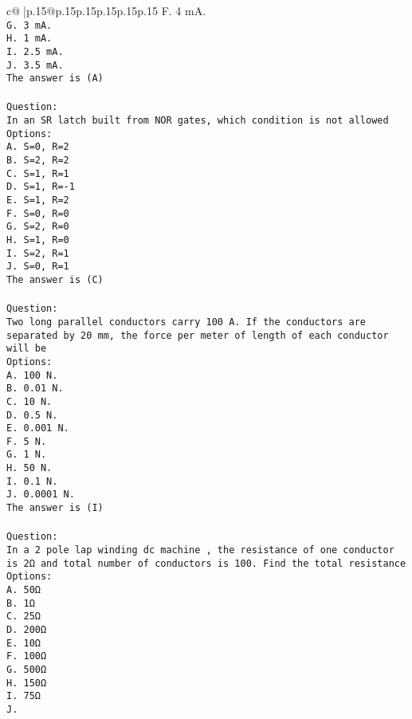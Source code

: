 \documentclass{article}
\begin{document}
{\begin{supertabular}{c@{$\;$}|p{.15\linewidth}@{}p{.15\linewidth}p{.15\linewidth}p{.15\linewidth}p{.15\linewidth}p{.15\linewidth}}
{{{F. 4 mA.\\ \tt G. 3 mA.\\ \tt H. 1 mA.\\ \tt I. 2.5 mA.\\ \tt J. 3.5 mA.\\ \tt The answer is (A)\\ \tt \\ \tt Question:\\ \tt In an SR latch built from NOR gates, which condition is not allowed\\ \tt Options:\\ \tt A. S=0, R=2\\ \tt B. S=2, R=2\\ \tt C. S=1, R=1\\ \tt D. S=1, R=-1\\ \tt E. S=1, R=2\\ \tt F. S=0, R=0\\ \tt G. S=2, R=0\\ \tt H. S=1, R=0\\ \tt I. S=2, R=1\\ \tt J. S=0, R=1\\ \tt The answer is (C)\\ \tt \\ \tt Question:\\ \tt Two long parallel conductors carry 100 A. If the conductors are separated by 20 mm, the force per meter of length of each conductor will be\\ \tt Options:\\ \tt A. 100 N.\\ \tt B. 0.01 N.\\ \tt C. 10 N.\\ \tt D. 0.5 N.\\ \tt E. 0.001 N.\\ \tt F. 5 N.\\ \tt G. 1 N.\\ \tt H. 50 N.\\ \tt I. 0.1 N.\\ \tt J. 0.0001 N.\\ \tt The answer is (I)\\ \tt \\ \tt Question:\\ \tt In a 2 pole lap winding dc machine , the resistance of one conductor is 2Ω and total number of conductors is 100. Find the total resistance\\ \tt Options:\\ \tt A. 50Ω\\ \tt B. 1Ω\\ \tt C. 25Ω\\ \tt D. 200Ω\\ \tt E. 10Ω\\ \tt F. 100Ω\\ \tt G. 500Ω\\ \tt H. 150Ω\\ \tt I. 75Ω\\ \tt J. }}}
\end{supertabular}}
\end{document}
